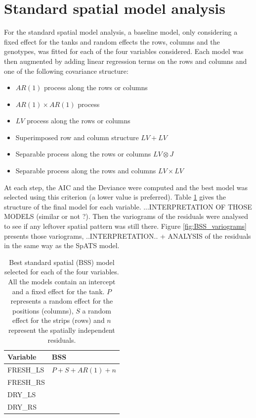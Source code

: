 \section{Standard spatial model analysis}
For the standard spatial model analysis, a baseline model, only considering a fixed effect for the tanks and random effects the rows, columns and the genotypes, was fitted for each of the four variables considered. Each model was then augmented by adding linear regression terms on the rows and columns and one of the following covariance structure:
\begin{itemize}
\item $AR(1)$ process along the rows or columns
\item $AR(1) \times AR(1)$ process
\item $LV$ process along the rows or columns
\item Superimposed row and column structure $LV + LV$
\item Separable process along the rows or columns $LV\otimes J$
\item Separable process along the rows and columns $LV \times LV$
\end{itemize}
At each step, the AIC and the Deviance were computed and the best model was selected using this criterion (a lower value is preferred). Table \ref{tab:selected_BSS_models} gives the structure of the final model for each variable. ...INTERPRETATION OF THOSE MODELS (similar or not ?). Then the variograms of the residuals were analysed to see if any leftover spatial pattern was still there. Figure \ref{fig:BSS_variograms} presents those variograms, ..INTERPRETATION.. + ANALYSIS of the residuals in the same way as the SpATS model.

\begin{table}[htbp]
  \centering
  \caption[Selected BSS models]{Best standard spatial (BSS) model selected for each of the four variables. All the models 
  contain an intercept and a fixed effect for the tank. $P$ represents a random effect for the positions (columns), $S$ a random effect for the strips (rows) and $n$ represent the spatially independent residuals.}
    \begin{tabular}{lr}
    \toprule
    Variable & \multicolumn{1}{l}{BSS} \\
    \midrule
    FRESH\_LS & $P + S + AR(1) + n$  \\
    FRESH\_RS &  \\
    DRY\_LS &  \\
    DRY\_RS &  \\
    \bottomrule
    \end{tabular}%
\label{tab:selected_BSS_models}
\end{table}%

